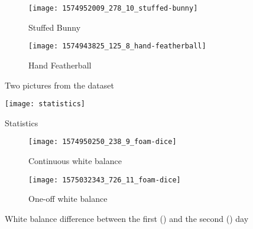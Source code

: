 \begin{figure}[hb]
  \centering
  \begin{subfigure}[b]{0.45\textwidth}
    \centering
    \texttt{[image: 1574952009\_278\_10\_stuffed-bunny]}
    \caption{Stuffed Bunny}
    \label{subfig:stuffed_bunny}
  \end{subfigure}
  \begin{subfigure}[b]{0.45\textwidth}
    \centering
    \texttt{[image: 1574943825\_125\_8\_hand-featherball]}
    \caption{Hand Featherball}
    \label{subfig:hand_featherball}
  \end{subfigure}
  \caption{Two pictures from the dataset}
  \label{fig:dataset}
\end{figure}

\begin{figure}[h]
  \centering
  \texttt{[image: statistics]}
  \caption{Statistics}
  \label{fig:statistics}
\end{figure}

\begin{figure}[h]
  \centering
  \begin{subfigure}[b]{0.45\textwidth}
    \centering
    \texttt{[image: 1574950250\_238\_9\_foam-dice]}
    \caption{Continuous white balance}
    \label{subfig:foam_dice_first_day}
  \end{subfigure}
  \begin{subfigure}[b]{0.45\textwidth}
    \centering
    \texttt{[image: 1575032343\_726\_11\_foam-dice]}
    \caption{One-off white balance}
    \label{subfig:foam_dice_second_day}
  \end{subfigure}
  \caption{White balance difference between the first () and the second () day}
  \label{fig:dataset_white_balance}
\end{figure}
